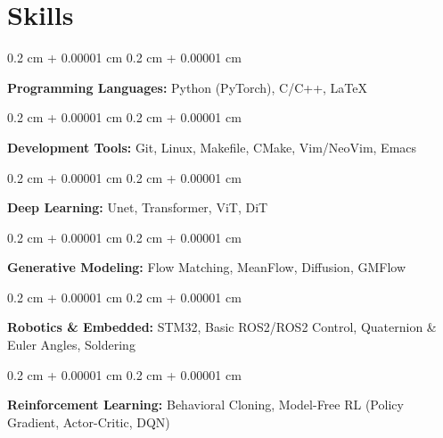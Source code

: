 \documentclass[10pt, letterpaper]{article}
\newenvironment{onecolentry}{
    \begin{adjustwidth}{
        0.2 cm + 0.00001 cm
    }{
        0.2 cm + 0.00001 cm
    }
}{
    \end{adjustwidth}
} %
\begin{document}

        \section{Skills}

        \begin{onecolentry}
            \textbf{Programming Languages:} Python (PyTorch), C/C++, LaTeX %
        \end{onecolentry}
        \vspace{0.1 cm}

	\begin{onecolentry}
          \textbf{Development Tools:} Git, Linux, Makefile, CMake, Vim/NeoVim, Emacs
        \end{onecolentry}
        \vspace{0.1 cm}

	\begin{onecolentry}
            \textbf{Deep Learning:} Unet, Transformer, ViT, DiT
        \end{onecolentry}
        \vspace{0.1 cm}

        \begin{onecolentry}
            \textbf{Generative Modeling:} Flow Matching, MeanFlow, Diffusion, GMFlow
        \end{onecolentry}
        \vspace{0.1 cm}

        \begin{onecolentry}
          \textbf{Robotics \& Embedded:} STM32, Basic ROS2/ROS2 Control, Quaternion \& Euler Angles, Soldering
        \end{onecolentry}
        \vspace{0.1 cm}
	
	\begin{onecolentry}
            \textbf{Reinforcement Learning:} Behavioral Cloning, Model-Free RL (Policy Gradient, Actor-Critic, DQN) 
        \end{onecolentry}
	
\end{document}
